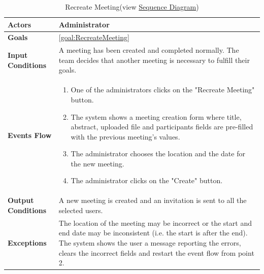 \begin{table}[H]
	\centering
	\def\arraystretch{1.5}
	\begin{tabular}{|m{7cm}|m{7cm}|}
		\hline
		\textbf{Actors}            & Administrator    \\ \hline
		\textbf{Goals}             & \ref{goal:RecreateMeeting}           \\ \hline
		\textbf{Input Conditions}  & A meeting has been created and completed normally. The team decides that another meeting is necessary to fulfill their goals. \\ \hline
		\textbf{Events Flow}       & 
		\begin{enumerate}[topsep=0pt, leftmargin=*]
			\item One of the administrators clicks on the "Recreate Meeting" button.
			\item The system shows a meeting creation form where title, abstract, uploaded file and participants fields are pre-filled with the previous meeting's values.
			\item The administrator chooses the location and the date for the new meeting.
			\item The administrator clicks on the "Create" button.
		\end{enumerate}              \\ \hline
		\textbf{Output Conditions} & A new meeting is created and an invitation is sent to all the selected users.           \\ \hline
		\textbf{Exceptions}        & The location of the meeting may be incorrect or the start and end date may be inconsistent (i.e. the start is after the end). The system shows the user a message reporting the errors, clears the incorrect fields and restart the event
		flow from point 2.           \\ \hline
	\end{tabular}
	\caption[Recreate Meeting]{{Recreate Meeting}\label{UseCaseDescr:RecreateMeeting} (view \hyperref[SeqDiagr:RecreateMeeting]{Sequence Diagram})}
\end{table}

